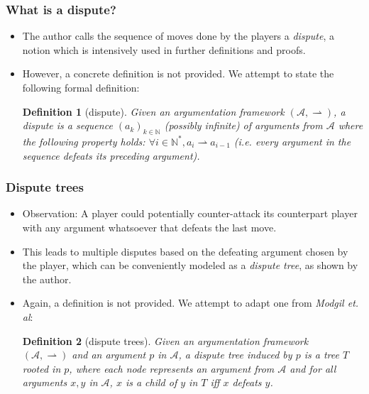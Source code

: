 \documentclass{beamer}
\newtheorem{Def}{Definition}[subsection]
\newcommand{\df}{\ensuremath{\rightharpoonup}}
\begin{document}
\begin{frame}
	\frametitle{What is a dispute?}
	\begin{itemize}
		\item The author calls the sequence of moves done by the players a \emph{dispute}, a notion which is intensively used in further definitions and proofs. \pause
		\item However, a concrete definition is not provided. We attempt to state the following formal definition: \pause
		\begin{Def}[dispute]
			Given an argumentation framework $(\mathcal{A}, \df)$, a dispute is a sequence $(a_{k})_{k \in \mathbb{N}}$ (possibly infinite) of arguments from $\mathcal{A}$ where the following property holds: $\forall i \in \mathbb{N^*},  a_{i} \df a_{i-1}$ (i.e. every argument in the sequence defeats its preceding argument).
		\end{Def}
	\end{itemize}
\end{frame}

\begin{frame}
	\frametitle{Dispute trees}
	\begin{itemize}
		\item Observation: A player could potentially counter-attack its counterpart player with any argument whatsoever that defeats the last move. \pause
		\item This leads to multiple disputes based on the defeating argument chosen by the player, which can be conveniently modeled as a \emph{dispute tree}, as shown by the author.\pause
		\item Again, a definition is not provided. We attempt to adapt one from \emph{Modgil et. al}:\pause
		\begin{Def}[dispute trees]
			Given an argumentation framework\\ $(\mathcal{A}, \df)$ and an argument $p$ in $\mathcal{A}$, a dispute tree induced by $p$ is a tree $T$ rooted in $p$, where each node represents an argument from $\mathcal{A}$ and for all arguments $x, y$ in $\mathcal{A}$, $x$ is a child of $y$ in $T$ iff $x$ defeats $y$.
		\end{Def}
	\end{itemize}
\end{frame}
\end{document}
